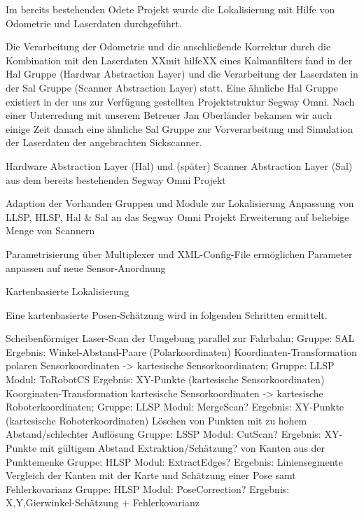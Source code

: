 

Im bereits bestehenden Odete Projekt wurde die Lokalisierung mit Hilfe von Odometrie und Laserdaten durchgeführt. 


Die Verarbeitung der Odometrie und die anschließende Korrektur durch die Kombination mit den
 Laserdaten XXmit hilfeXX eines Kalmanfilters fand in der Hal Gruppe (Hardwar Abstraction Layer)
 und die Verarbeitung der Laserdaten in der Sal Gruppe (Scanner Abstraction Layer) statt.
 Eine ähnliche Hal Gruppe existiert in der uns zur Verfügung gestellten Projektstruktur Segway Omni.
 Nach einer Unterredung mit unserem Betreuer Jan Oberländer bekamen wir auch einige Zeit danach eine
  ähnliche Sal Gruppe zur Vorverarbeitung und Simulation der Laserdaten der angebrachten Sickscanner. 


Hardware Abstraction Layer (Hal) und (später) Scanner Abstraction Layer (Sal)
aus dem bereits bestehenden Segway Omni Projekt


Adaption der Vorhanden Gruppen und Module zur Lokalisierung 
Anpassung von LLSP, HLSP, Hal \& Sal an das Segway Omni Projekt
Erweiterung auf beliebige Menge von Scannern


Parametrisierung über Multiplexer und XML-Config-File ermöglichen
Parameter anpassen auf neue Sensor-Anordnung



Kartenbasierte Lokalisierung

Eine kartenbasierte Posen-Schätzung wird in folgenden Schritten ermittelt.

    Scheibenförmiger Laser-Scan der Umgebung parallel zur Fahrbahn;
    Gruppe: SAL
    Ergebnis: Winkel-Abstand-Paare (Polarkoordinaten)
    Koordinaten-Transformation polaren Sensorkoordinaten -> kartesische Sensorkoordinaten;
    Gruppe: LLSP
    Modul: ToRobotCS
    Ergebnis: XY-Punkte (kartesische Sensorkoordinaten)
    Koorginaten-Transformation kartesische Sensorkoordinaten -> kartesische Roboterkoordinaten;
    Gruppe: LLSP
    Modul: MergeScan?
    Ergebnis: XY-Punkte (kartesische Roboterkoordinaten)
    Löschen von Punkten mit zu hohem Abstand/schlechter Auflösung
    Gruppe: LSSP
    Modul: CutScan?
    Ergebnis: XY-Punkte mit gültigem Abstand
    Extraktion/Schätzung? von Kanten aus der Punktemenke
    Gruppe: HLSP
    Modul: ExtractEdges?
    Ergebnis: Liniensegmente
    Vergleich der Kanten mit der Karte und Schätzung einer Pose samt Fehlerkovarianz
    Gruppe: HLSP
    Modul: PoseCorrection?
    Ergebnis: X,Y,Gierwinkel-Schätzung + Fehlerkovarianz 

